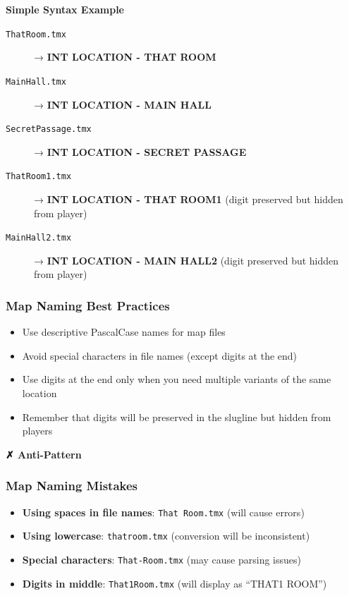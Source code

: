 \documentclass[11pt,letterpaper,oldstylefigures]{memoir}
\newenvironment{AntiPattern}
{\begingroup
\small
\setlength{\parindent}{0pt}
\setlength{\parskip}{0.5em}
\allowdisplaybreaks
\setlength{\displaywidowpenalty}{0}
\setlength{\widowpenalty}{0}
\setlength{\clubpenalty}{0}
\setlength{\interlinepenalty}{0}
\begin{tcolorbox}[
    colback=red!5,
    colframe=red!75!black,
    boxrule=0.5pt,
    arc=2pt,
    left=0.5em,
    right=0.5em,
    top=0.25em,
    bottom=0.25em
]
\textbf{✗ Anti-Pattern}
\end{tcolorbox}\par
}
{\endgroup}
\newenvironment{SimpleExample}
{\begingroup
\small
\setlength{\parindent}{0pt}
\setlength{\parskip}{0.5em}
\allowdisplaybreaks
\setlength{\displaywidowpenalty}{0}
\setlength{\widowpenalty}{0}
\setlength{\clubpenalty}{0}
\setlength{\interlinepenalty}{0}
\begin{tcolorbox}[
    colback=blue!5,
    colframe=blue!75!black,
    boxrule=0.5pt,
    arc=2pt,
    left=0.5em,
    right=0.5em,
    top=0.25em,
    bottom=0.25em
]
\textbf{Simple Syntax Example}
\end{tcolorbox}\par
}
{\endgroup}
\newcommand{\fountain}[1]{\textbf{#1}}
\begin{document}
\begin{SimpleExample}
\begin{description}
\item[\texttt{ThatRoom.tmx}] → \fountain{INT LOCATION - THAT ROOM}
\item[\texttt{MainHall.tmx}] → \fountain{INT LOCATION - MAIN HALL}
\item[\texttt{SecretPassage.tmx}] → \fountain{INT LOCATION - SECRET PASSAGE}
\item[\texttt{ThatRoom1.tmx}] → \fountain{INT LOCATION - THAT ROOM1} (digit preserved but hidden from player)
\item[\texttt{MainHall2.tmx}] → \fountain{INT LOCATION - MAIN HALL2} (digit preserved but hidden from player)
\end{description}
\end{SimpleExample}

\subsubsection{Map Naming Best Practices}
\begin{itemize}
\item Use descriptive PascalCase names for map files
\item Avoid special characters in file names (except digits at the end)
\item Use digits at the end only when you need multiple variants of the same location
\item Remember that digits will be preserved in the slugline but hidden from players
\end{itemize}


\begin{AntiPattern}
\subsubsection{Map Naming Mistakes}
\begin{itemize}
\item \textbf{Using spaces in file names}: \texttt{That Room.tmx} (will cause errors)
\item \textbf{Using lowercase}: \texttt{thatroom.tmx} (conversion will be inconsistent)
\item \textbf{Special characters}: \texttt{That-Room.tmx} (may cause parsing issues)
\item \textbf{Digits in middle}: \texttt{That1Room.tmx} (will display as ``THAT1 ROOM'')
\end{itemize}
\end{AntiPattern}
\end{document}
